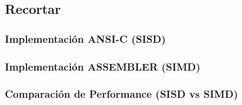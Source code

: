     \subsection{Recortar}
        \subsubsection{Implementación ANSI-C (SISD)}
        \subsubsection{Implementación ASSEMBLER (SIMD)}
        \subsubsection{Comparación de Performance (SISD vs SIMD)}
